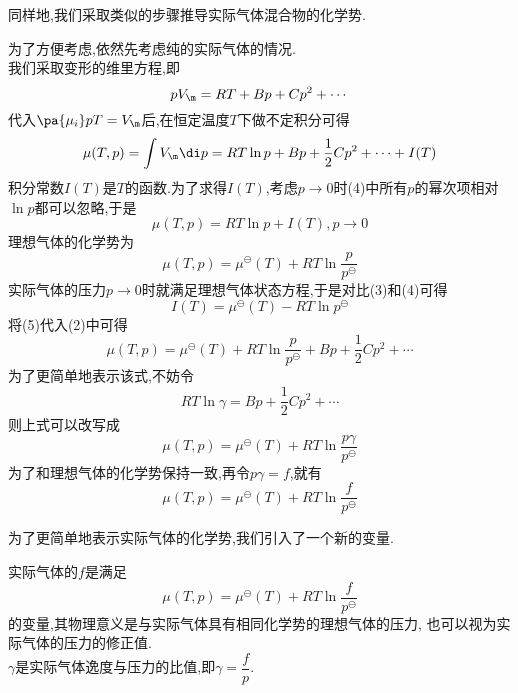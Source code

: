 \documentclass{ctexart}
\begin{document}
\indent 同样地,我们采取类似的步骤推导实际气体混合物的化学势.
\begin{derivation}\setcounter{equation}{0}
    为了方便考虑,依然先考虑纯的实际气体的情况.\\
    我们采取变形的维里方程,即
    \begin{equation}
        pV_{\m}=RT+Bp+Cp^2+\cdots
    \end{equation}
    代入$\pa{\mu_i}pT=V_{\m}$后,在恒定温度$T$下做不定积分可得
    \begin{equation}
        \mu(T,p)=\int{V_\m}\di p=RT\ln p+Bp+\dfrac12Cp^2+\cdots+I(T)
    \end{equation}
    积分常数$I(T)$是$T$的函数.为了求得$I(T)$,考虑$p\to0$时(4)中所有$p$的幂次项相对$\ln p$都可以忽略,于是
    \begin{equation}
        \mu(T,p)=RT\ln p+I(T),p\to0
    \end{equation}
    理想气体的化学势为
    \begin{equation}
        \mu(T,p)=\mu^\ominus(T)+RT\ln\dfrac{p}{p^\ominus}
    \end{equation}
    实际气体的压力$p\to0$时就满足理想气体状态方程,于是对比(3)和(4)可得
    \begin{equation}
        I(T)=\mu^\ominus(T)-RT\ln p^\ominus
    \end{equation}
    将(5)代入(2)中可得
    \begin{equation}
        \mu(T,p)=\mu^\ominus(T)+RT\ln\dfrac{p}{p^\ominus}+Bp+\dfrac12Cp^2+\cdots
    \end{equation}
    为了更简单地表示该式,不妨令
    \begin{equation}
        RT\ln\gamma=Bp+\dfrac12Cp^2+\cdots
    \end{equation}
    则上式可以改写成
    \begin{equation}
        \mu(T,p)=\mu^\ominus(T)+RT\ln\dfrac{p\gamma}{p^\ominus}
    \end{equation}
    为了和理想气体的化学势保持一致,再令$p\gamma=f$,就有
    \begin{equation}
        \mu(T,p)=\mu^\ominus(T)+RT\ln\dfrac{f}{p^\ominus}
    \end{equation}

\end{derivation}
为了更简单地表示实际气体的化学势,我们引入了一个新的变量.
\begin{definition}[4B.4.2 逸度]
    实际气体的$f$是满足
    \[\mu(T,p)=\mu^\ominus(T)+RT\ln\dfrac{f}{p^\ominus}\]
    的变量,其物理意义是与实际气体具有相同化学势的理想气体的压力,%
    也可以视为实际气体的压力的修正值.\\
    $\gamma$是实际气体逸度与压力的比值,即$\gamma=\dfrac{f}{p}$.
\end{definition}
\end{document}
